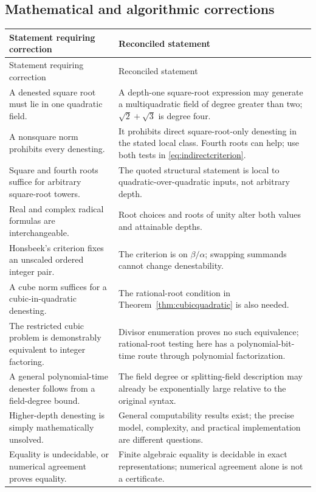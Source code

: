 \documentclass[11pt,oneside]{article}
\numberwithin{equation}{section}
\theoremstyle{definition}
\theoremstyle{remark}
\begin{document}
\subsection{Mathematical and algorithmic corrections}
\begin{longtable}{@{}p{}p{}@{}}
\toprule
Statement requiring correction & Reconciled statement\\
\midrule\endfirsthead
\toprule Statement requiring correction & Reconciled statement\\\midrule\endhead
\bottomrule\endfoot
A denested square root must lie in one quadratic field. & A depth-one square-root expression may generate a multiquadratic field of degree greater than two; $\sqrt2+\sqrt3$ is degree four.\\[5pt]
A nonsquare norm prohibits every denesting. & It prohibits direct square-root-only denesting in the stated local class. Fourth roots can help; use both tests in \eqref{eq:indirectcriterion}.\\[5pt]
Square and fourth roots suffice for arbitrary square-root towers. & The quoted structural statement is local to quadratic-over-quadratic inputs, not arbitrary depth.\\[5pt]
Real and complex radical formulas are interchangeable. & Root choices and roots of unity alter both values and attainable depths.\\[5pt]
Honsbeek's criterion fixes an unscaled ordered integer pair. & The criterion is on $\beta/\alpha$; swapping summands cannot change denestability.\\[5pt]
A cube norm suffices for a cubic-in-quadratic denesting. & The rational-root condition in Theorem~\ref{thm:cubicquadratic} is also needed.\\[5pt]
The restricted cubic problem is demonstrably equivalent to integer factoring. & Divisor enumeration proves no such equivalence; rational-root testing here has a polynomial-bit-time route through polynomial factorization.\\[5pt]
A general polynomial-time denester follows from a field-degree bound. & The field degree or splitting-field description may already be exponentially large relative to the original syntax.\\[5pt]
Higher-depth denesting is simply mathematically unsolved. & General computability results exist; the precise model, complexity, and practical implementation are different questions.\\[5pt]
Equality is undecidable, or numerical agreement proves equality. & Finite algebraic equality is decidable in exact representations; numerical agreement alone is not a certificate.\\[5pt]

\end{longtable}
\end{document}
